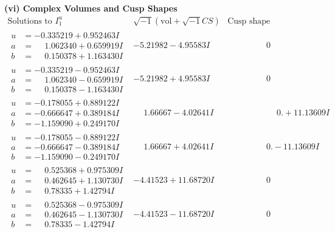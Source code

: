 \documentclass[1p]{elsarticle_modified}
\theoremstyle{definition}
\newcommand{\I}{\sqrt{-1}}
\begin{document}
\newpage\flushleft \textbf{(vi) Complex Volumes and Cusp Shapes}
$$\begin{array}{c|c|c}  
\text{Solutions to }I^u_{1}& \I (\text{vol} + \sqrt{-1}CS) & \text{Cusp shape}\\
 \hline 
\begin{aligned}
u &= -0.335219 + 0.952463 I \\
a &= \phantom{-}1.062340 + 0.659919 I \\
b &= \phantom{-}0.150378 + 1.163430 I\end{aligned}
 & -5.21982 - 4.95583 I & \phantom{-0.000000 } 0 \\ \hline\begin{aligned}
u &= -0.335219 - 0.952463 I \\
a &= \phantom{-}1.062340 - 0.659919 I \\
b &= \phantom{-}0.150378 - 1.163430 I\end{aligned}
 & -5.21982 + 4.95583 I & \phantom{-0.000000 } 0 \\ \hline\begin{aligned}
u &= -0.178055 + 0.889122 I \\
a &= -0.666647 + 0.389184 I \\
b &= -1.159090 + 0.249170 I\end{aligned}
 & \phantom{-}1.66667 - 4.02641 I & \phantom{-0.000000 -}0. + 11.13609 I \\ \hline\begin{aligned}
u &= -0.178055 - 0.889122 I \\
a &= -0.666647 - 0.389184 I \\
b &= -1.159090 - 0.249170 I\end{aligned}
 & \phantom{-}1.66667 + 4.02641 I & \phantom{-0.000000 } 0. - 11.13609 I \\ \hline\begin{aligned}
u &= \phantom{-}0.525368 + 0.975309 I \\
a &= \phantom{-}0.462645 + 1.130730 I \\
b &= \phantom{-}0.78335 + 1.42794 I\end{aligned}
 & -4.41523 + 11.68720 I & \phantom{-0.000000 } 0 \\ \hline\begin{aligned}
u &= \phantom{-}0.525368 - 0.975309 I \\
a &= \phantom{-}0.462645 - 1.130730 I \\
b &= \phantom{-}0.78335 - 1.42794 I\end{aligned}
 & -4.41523 - 11.68720 I & \phantom{-0.000000 } 0 \\ \hline\begin{aligned}

\end{aligned}
\end{array}$$
\end{document}
